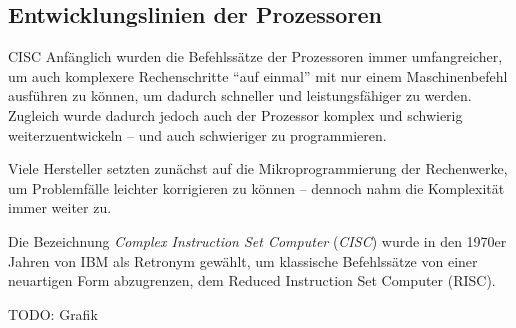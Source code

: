 \subsection{Entwicklungslinien der Prozessoren}\label{subsec:entwicklungslinien-der-prozessoren}

\begin{defi}[Befehlssatzarchitektur]{CISC}
    Anfänglich wurden die Befehlssätze der Prozessoren immer umfangreicher, um auch komplexere Rechenschritte \enquote{auf einmal} mit nur einem Maschinenbefehl ausführen zu können, um dadurch schneller und leistungsfähiger zu werden.
    Zugleich wurde dadurch jedoch auch der Prozessor komplex und schwierig weiterzuentwickeln -- und auch schwieriger zu programmieren.

    Viele Hersteller setzten zunächst auf die Mikroprogrammierung der Rechenwerke, um Problemfälle leichter korrigieren zu können -- dennoch nahm die Komplexität immer weiter zu.

    Die Bezeichnung \emph{Complex Instruction Set Computer} (\emph{CISC}) wurde in den 1970er Jahren von IBM als Retronym gewählt, um klassische Befehlssätze von einer neuartigen Form abzugrenzen, dem Reduced Instruction Set Computer (RISC).

    TODO: Grafik
\end{defi}

